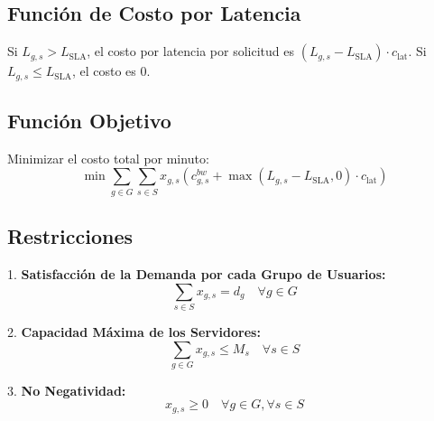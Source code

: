 \subsection*{Función de Costo por Latencia}
Si $L_{g,s} > L_{\text{SLA}}$, el costo por latencia por solicitud es $(L_{g,s} - L_{\text{SLA}}) \cdot c_{\text{lat}}$. Si $L_{g,s} \leq L_{\text{SLA}}$, el costo es 0.

\subsection*{Función Objetivo}
Minimizar el costo total por minuto:
\begin{equation}
\min \sum_{g \in G}\sum_{s \in S} x_{g,s} \left( c_{g,s}^{bw} + \max(L_{g,s}-L_{\text{SLA}}, 0) \cdot c_{\text{lat}} \right)
\end{equation}

\subsection*{Restricciones}
1. \textbf{Satisfacción de la Demanda por cada Grupo de Usuarios:}
\begin{equation}
\sum_{s \in S} x_{g,s} = d_g \quad \forall g \in G
\end{equation}

2. \textbf{Capacidad Máxima de los Servidores:}
\begin{equation}
\sum_{g \in G} x_{g,s} \leq M_s \quad \forall s \in S
\end{equation}

3. \textbf{No Negatividad:}
\begin{equation}
x_{g,s} \geq 0 \quad \forall g \in G, \forall s \in S
\end{equation}
